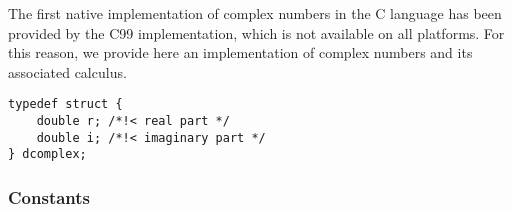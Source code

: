 The first native implementation of complex numbers in the C language has been
provided by the C99 implementation, which is not available on all
platforms. For this reason, we provide here an implementation of complex
numbers and its associated calculus.

\begin{verbatim}
typedef struct {
    double r; /*!< real part */
    double i; /*!< imaginary part */
} dcomplex;
\end{verbatim}


\subsubsection{Constants}

\begin{describeconst}
\end{describeconst}

